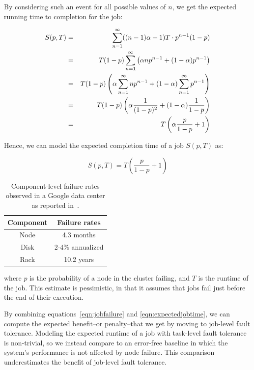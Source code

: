 By considering such an event for all possible values of $n$, we get the
expected running time to completion for the job:

\vspace{-4mm}

\begin{eqnarray}
   S(p, T) &=& \sum_{n=1}^{\infty} ((n-1) \alpha + 1) T \cdot p^{n-1}(1-p)  \notag \\
           &=& T(1-p) \sum_{n=1}^{\infty} \left(\alpha n p^{n-1} + (1-\alpha) p^{n-1}\right)  \notag \\
           &=& T(1-p) \left(\alpha \sum_{n=1}^{\infty} n p^{n-1} + (1 - \alpha) \sum_{n=1}^{\infty} p^{n-1}\right) \notag \\
           &=& T(1-p) \left(\alpha \frac{1}{(1-p)^2} + (1 - \alpha) \frac{1}{1-p}\right) \notag \\
           &=& T \left(\alpha \frac{p}{1-p} + 1\right)
\label{eqn:job}
\end{eqnarray}

Hence, we can model the expected completion time of a job $S(p,T)$ as:

\begin{equation}
S(p,T) = T\left(\frac{p}{1 - p} + 1\right)
\label{eqn:expectedjobtime}
\end{equation}

\begin{table}[t]
\centering
\caption{\label{tbl:googleMttf} Component-level failure rates
observed in a Google data center as reported
in~\cite{google-availability:osdi10}.}
\begin{tabular}{|c|c|} \hline
\textbf{Component} & \textbf{Failure rates}\\\hline
Node & 4.3 months \\
Disk & 2-4\% annualized\\
Rack & 10.2 years \\\hline
\end{tabular}
\end{table}

where $p$ is the probability of a node in the cluster failing, and $T$ is the
runtime of the job.  This estimate is pessimistic, in that it assumes that jobs
fail just before the end of their execution.

By combining equations~\ref{eqn:jobfailure} and \ref{eqn:expectedjobtime}, we
can compute the expected benefit--or penalty--that we get by moving to
job-level fault tolerance.  Modeling the expected runtime of a job with
task-level fault tolerance is non-trivial, so we instead compare to an
error-free baseline in which the system's performance is not affected by node
failure.  This comparison underestimates the benefit of job-level fault
tolerance.

